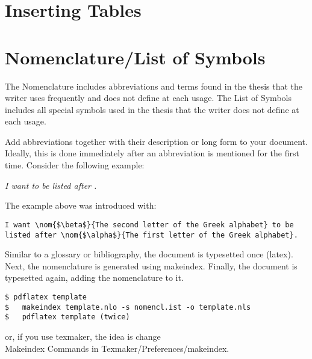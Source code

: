 

\section{Inserting Tables} %
\label{sec:inserting_tables}


\section{Nomenclature/List of Symbols} %
\label{sec:nomenclature}

The Nomenclature includes abbreviations and terms found in the thesis that the writer uses frequently and does not define at each usage. The List of Symbols includes all special symbols used in the thesis that the writer does not define at each usage.

Add abbreviations together with their description or long form to your document. Ideally, this is done immediately after an abbreviation is mentioned for the first time. Consider the following example:

\textit{I want  to be listed after .}

The example above was introduced with:

 \begin{lstlisting}
I want \nom{$\beta$}{The second letter of the Greek alphabet} to be listed after \nom{$\alpha$}{The first letter of the Greek alphabet}.
 \end{lstlisting}
 
Similar to a glossary or bibliography, the document is typesetted once (latex). Next, the nomenclature is generated using makeindex. Finally, the document is typesetted again, adding the nomenclature to it.

\begin{verbatim}
$ pdflatex template
$	makeindex template.nlo -s nomencl.ist -o template.nls
$	pdflatex template (twice)
\end{verbatim}

or, if you use texmaker, the idea is change  \\

Makeindex Commands in  Texmaker/Preferences/makeindex. \\

